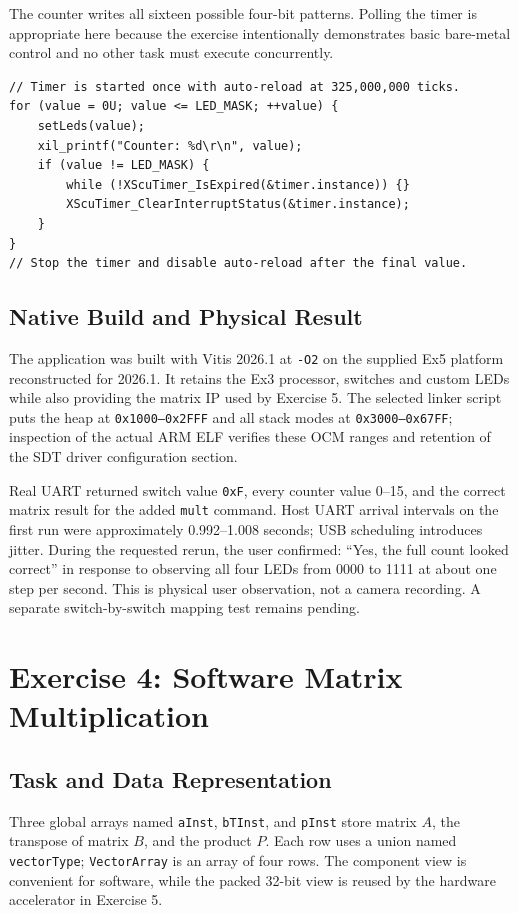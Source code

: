 \documentclass[11pt,a4paper]{article}
\begin{document}
The counter writes all sixteen possible four-bit patterns. Polling the timer is
appropriate here because the exercise intentionally demonstrates basic
bare-metal control and no other task must execute concurrently.

\begin{lstlisting}[style=cppstyle,caption={One-second binary LED counter}]
// Timer is started once with auto-reload at 325,000,000 ticks.
for (value = 0U; value <= LED_MASK; ++value) {
    setLeds(value);
    xil_printf("Counter: %d\r\n", value);
    if (value != LED_MASK) {
        while (!XScuTimer_IsExpired(&timer.instance)) {}
        XScuTimer_ClearInterruptStatus(&timer.instance);
    }
}
// Stop the timer and disable auto-reload after the final value.
\end{lstlisting}

\subsection{Native Build and Physical Result}
The application was built with Vitis 2026.1 at \texttt{-O2} on the supplied
Ex5 platform reconstructed for 2026.1. It retains the Ex3 processor, switches
and custom LEDs while also providing the matrix IP used by Exercise 5.
The selected linker script puts the heap at \texttt{0x1000--0x2FFF} and all
stack modes at \texttt{0x3000--0x67FF}; inspection of the actual ARM ELF verifies
these OCM ranges and retention of the SDT driver configuration section.

Real UART returned switch value \texttt{0xF}, every counter value 0--15, and the
correct matrix result for the added \texttt{mult} command. Host UART arrival
intervals on the first run were approximately 0.992--1.008 seconds; USB scheduling
introduces jitter. During the requested rerun, the user confirmed: ``Yes, the
full count looked correct'' in response to observing all four LEDs from 0000
to 1111 at about one step per second. This is physical user observation,
not a camera recording. A separate switch-by-switch mapping test remains pending.

\section{Exercise 4: Software Matrix Multiplication}

\subsection{Task and Data Representation}
Three global arrays named \texttt{aInst}, \texttt{bTInst}, and \texttt{pInst}
store matrix $A$, the transpose of matrix $B$, and the product $P$. Each row uses
a union named \texttt{vectorType}; \texttt{VectorArray} is an array of four rows.
The component view is convenient for software,
while the packed 32-bit view is reused by the hardware accelerator in Exercise 5.
\end{document}

